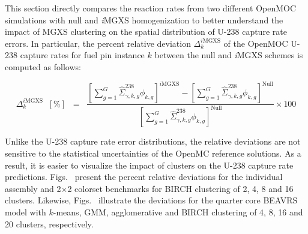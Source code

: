 This section directly compares the reaction rates from two different OpenMOC simulations with null and \textit{i}\ac{MGXS} homogenization to better understand the impact of \ac{MGXS} clustering on the spatial distribution of U-238 capture rate errors. In particular, the percent relative deviation $\Delta_{k}^{\mathrm{\textit{i}MGXS}}$ of the OpenMOC U-238 capture rates for fuel pin instance $k$ between the null and \textit{i}\ac{MGXS} schemes is computed as follows:

\begin{equation}
\label{eqn:chap11-compare-openmoc}
\Delta_{k}^{\mathrm{\textit{i}MGXS}} \;\; [\%] \;\; = \;\; \frac{\left[\displaystyle\sum\limits_{g=1}^{G} \hat{\Sigma}^{238}_{\gamma,k,g}\phi_{k,g}\right]^{\mathrm{\textit{i}MGXS}} - \left[\displaystyle\sum\limits_{g=1}^{G} \hat{\Sigma}^{238}_{\gamma,k,g}\phi_{k,g}\right]^{\mathrm{Null}}}{\left[\displaystyle\sum\limits_{g=1}^{G} \hat{\Sigma}^{238}_{\gamma,k,g}\phi_{k,g}\right]^{\mathrm{Null}}} \times 100
\end{equation}

\noindent Unlike the U-238 capture rate error distributions, the relative deviations are not sensitive to the statistical uncertainties of the OpenMC reference solutions. As a result, it is easier to visualize the impact of clusters on the U-238 capture rate predictions. Figs.~ present the percent relative deviations for the individual assembly and 2$\times$2 colorset benchmarks for BIRCH clustering of 2, 4, 8 and 16 clusters. Likewise, Figs.~ illustrate the deviations for the quarter core \ac{BEAVRS} model with $k$-means, \ac{GMM}, agglomerative and BIRCH clustering of 4, 8, 16 and 20 clusters, respectively.

